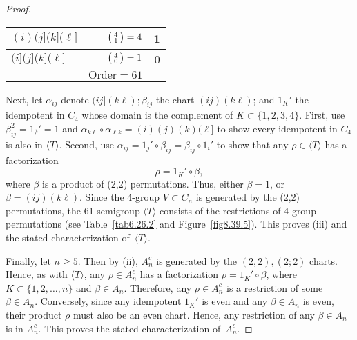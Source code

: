 \documentclass{surv-l}
\numberwithin{equation}{section}
\numberwithin{table}{section}
\numberwithin{figure}{section}
\theoremstyle{plain}
\theoremstyle{definition}
\begin{document}
\begin{proof}
\begin{table}[!h]
{\begin{tabular}{|lrr|}
$(i)(j](k](\ell]$ &$\big(\kern0.5pt\begin{smallmatrix}
4\\ 1\end{smallmatrix}\kern0.5pt\big)=4$ &1 \\
\hline
$(i](j](k](\ell]$ &$\big(\kern0.5pt\begin{smallmatrix}4\\
0\end{smallmatrix}\kern0.5pt\big)=1$ &0 \\
\hline
&$\mathrm{Order} = 61$ & \\
\hline
\end{tabular}}{}
\end{table}

\noindent Next, let $\alpha_{ij}$ denote $(ij](k\ell);\beta_{ij}$ the chart
$(ij)(k\ell)$; and $1_{K}'$ the idempotent in $C_{4}$ whose domain
is the complement of $K\subset\{1,2,3,4\}$. First, use
$\beta_{ij}^{2}= 1_{\emptyset}'=1$ and $\alpha_{k\ell}\circ
\alpha_{\ell k}=(i)(j)(k)(\ell]$ to show every idempotent in $C_{4}$
is also in $\langle T\rangle$. Second, use
$\alpha_{ij}=1_{j}'\circ\beta_{ij}=\beta_{ij}\circ 1_{i}'$ to show
that any $\rho\in\langle T\rangle$ has a factorization
\[
\rho=1_{K}'\circ\beta,
\]
where $\beta$ is a product of (2,2) permutations. Thus, either
$\beta=1$, or $\beta= (ij)(k\ell)$. Since the 4-group $V\subset
C_{n}$ is generated by the (2,2) permutations, the 61-semigroup
$\langle T\rangle$ consists of the restrictions of 4-group
permutations (see Table~\ref{tab6.26.2} and
Figure~\ref{fig8.39.5}). This proves (iii) and the stated
characterization of~$\langle T\rangle$.

Finally, let $n \geq 5$. Then by (ii), $A_{n}^{c}$ is generated by
the $(2,2),(2;2)$ charts. Hence, as with $\langle T\rangle$, any
$\rho\in A_{n}^{c}$ has a factorization $\rho=1_{K}'\circ\beta$,
where $K\subset\{1,2,\ldots, n\}$ and $\beta\in A_{n}$. Therefore,
any $\rho\in A_{n}^{c}$ is a restriction of some $\beta\in A_{n}$.
Conversely, since any idempotent $1_{K}'$ is even and any
$\beta\in A_{n}$ is even, their product $\rho$ must also be an
even chart. Hence, any restriction of any $\beta\in A_{n}$ is in
$A_{n}^{c}$. This proves the stated characterization
of~$A_{n}^{c}.$
\end{proof}
\end{document}

